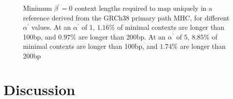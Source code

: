 \begin{figure}[t]
  \centering
  \caption[Minimum $\beta^\prime = 0$ context lengths]{Minimum $\beta^\prime = 0$ context lengths required to map uniquely in a reference derived from the GRCh38 primary path MHC, for different $\alpha^\prime$ values. At an $\alpha^\prime$ of $1$, $1.16\%$ of minimal contexts are longer than 100bp, and $0.97\%$ are longer than 200bp. At an $\alpha^\prime$ of $5$, $8.85\%$ of minimal contexts are longer than 100bp, and $1.74\%$ are longer than 200bp}
  \label{fig:contexts}
\end{figure}

\section{Discussion}


